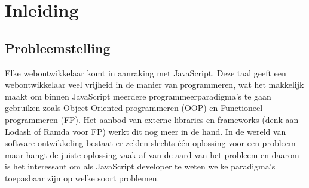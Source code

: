 
\chapter{Inleiding}
\label{ch:inleiding}



\section{Probleemstelling}
\label{sec:probleemstelling}
Elke webontwikkelaar komt in aanraking met JavaScript. Deze taal geeft een webontwikkelaar veel vrijheid in de manier van programmeren, wat het makkelijk maakt om binnen JavaScript meerdere programmeerparadigma's te gaan gebruiken zoals Object-Oriented programmeren (OOP) en Functioneel programmeren (FP). Het aanbod van externe libraries en frameworks (denk aan Lodash of Ramda voor FP) werkt dit nog meer in de hand. In de wereld van software ontwikkeling bestaat er zelden slechts één oplossing voor een probleem maar hangt de juiste oplossing vaak af van de aard van het probleem en daarom is het interessant om als JavaScript developer te weten welke paradigma's toepasbaar zijn op welke soort problemen.

